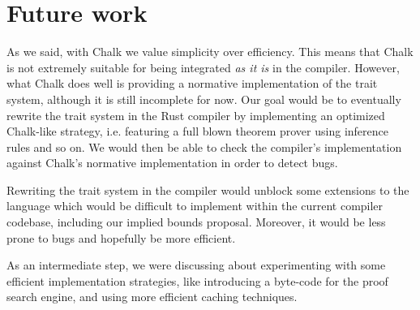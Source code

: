 \documentclass[twocolumn]{article}
\begin{document}
\section{Future work}
As we said, with Chalk we value simplicity over efficiency. This means that Chalk is not extremely suitable for being integrated \textit{as it is} in the compiler. However, what Chalk does well is providing a normative implementation of the trait system, although it is still incomplete for now. Our goal would be to eventually rewrite the trait system in the Rust compiler by implementing an optimized Chalk-like strategy, i.e. featuring a full blown theorem prover using inference rules and so on. We would then be able to check the compiler's implementation against Chalk's normative implementation in order to detect bugs.

Rewriting the trait system in the compiler would unblock some extensions to the language which would be difficult to implement within the current compiler codebase, including our implied bounds proposal. Moreover, it would be less prone to bugs and hopefully be more efficient.

As an intermediate step, we were discussing about experimenting with some efficient implementation strategies, like introducing a byte-code for the proof search engine, and using more efficient caching techniques.

\printbibliography
\end{document}
